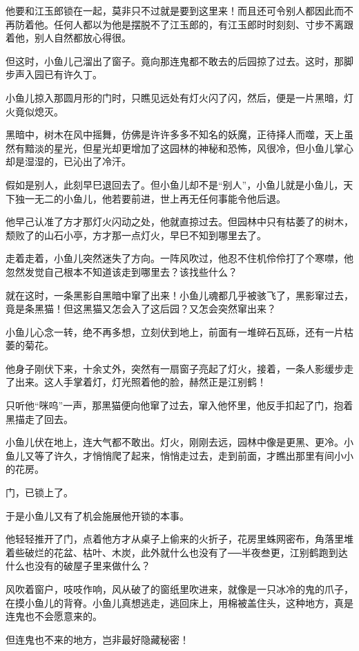 \documentclass[12pt,oneside]{book}
\begin{document}
他要和江玉郎锁在一起，莫非只不过就是要到这里来！而且还可令别人都因此而不再防着他。任何人都以为他是摆脱不了江玉郎的，有江玉郎时时刻刻、寸步不离跟着他，别人自然都放心得很。

但这时，小鱼儿己溜出了窗子。竟向那连鬼都不敢去的后园掠了过去。这时，那脚步声入园已有许久丁。

小鱼儿掠入那圆月形的门时，只瞧见远处有灯火闪了闪，然后，便是一片黑暗，灯火竟似熄灭。

黑暗中，树木在风中摇舞，仿佛是许许多多不知名的妖魔，正待择人而噬，天上虽然有黯淡的星光，但星光却更增加了这园林的神秘和恐怖，风很冷，但小鱼儿掌心却是湿湿的，已沁出了冷汗。

假如是别人，此刻早巳退回去了。但小鱼儿却不是``别人''，小鱼儿就是小鱼儿，天下独一无二的小鱼儿，他若要前进，世上再无任何事能令他后退。

他早己认准了方才那灯火闪动之处，他就直掠过去。但园林中只有枯萎了的树木，颓败了的山石小亭，方才那一点灯火，早巳不知到哪里去了。

走着走着，小鱼儿突然迷失了方向。一阵风吹过，他忍不住机伶伶打了个寒噤，他忽然发觉自己根本不知道该走到哪里去？该找些什么？

就在这时，一条黑影自黑暗中窜了出来！小鱼儿魂都几乎被骇飞了，黑影窜过去，竟是条黑猫！但这黑猫又怎会入了这后园？又怎会突然窜出来？

小鱼儿心念一转，绝不再多想，立刻伏到地上，前面有一堆碎石瓦砾，还有一片枯萎的菊花。

他身子刚伏下来，十余丈外，突然有一扇窗子亮起了灯火，接着，一条人影缓步走了出来。这人手掌着灯，灯光照着他的脸，赫然正是江别鹤！

只听他``咪呜''一声，那黑猫便向他窜了过去，窜入他怀里，他反手扣起了门，抱着黑描走了回去。

小鱼儿伏在地上，连大气都不敢出。灯火，刚刚去远，园林中像是更黑、更冷。小鱼儿又等了许久，才悄悄爬了起来，悄悄走过去，走到前面，才瞧出那里有间小小的花房。

门，已锁上了。

于是小鱼儿又有了机会施展他开锁的本事。

他轻轻推开了门，点着他方才从桌子上偷来的火折子，花房里蛛网密布，角落里堆着些破烂的花盆、枯叶、木炭，此外就什么也没有了──半夜叁更，江别鹤跑到达什么也没有的破屋子里来做什么？

风吹着窗户，吱吱作响，风从破了的窗纸里吹进来，就像是一只冰冷的鬼的爪子，在摸小鱼儿的背脊。小鱼儿真想逃走，逃回床上，用棉被盖住头，这种地方，真是连鬼也不会愿意来的。

但连鬼也不来的地方，岂非最好隐藏秘密！
\end{document}
